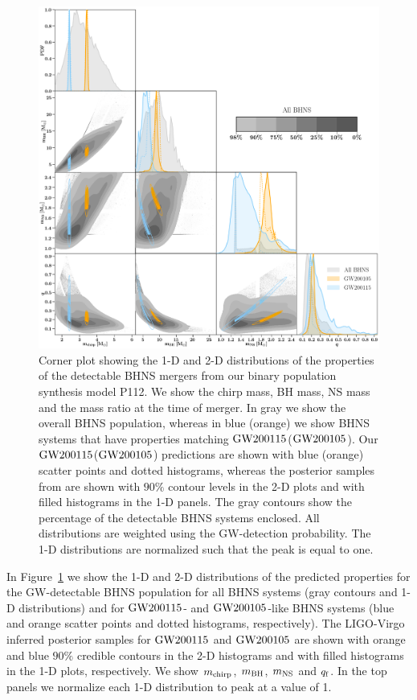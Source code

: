 \documentclass{aastex63}
\newcommand{\mnsf}{\ensuremath{m_{\rm{NS}}}\xspace}
\newcommand{\mbhf}{\ensuremath{m_{\rm{BH}}}\xspace}
\newcommand{\mchirpf}{\ensuremath{{m}_{\rm{chirp}}}\xspace}
\newcommand{\qf}{\ensuremath{q_{\rm{f}}}\xspace}
\newcommand{\gwone}{\ensuremath{\rm{GW200115}}\xspace}
\newcommand{\gwzero}{\ensuremath{\rm{GW200105}}\xspace}
\newcommand{\model}{P112\xspace}
\begin{document}
\begin{figure}
    \centering
\includegraphics[width=1.0\textwidth]{figures/Scatter_Final_kde_with_LV_112_P.png} 
    \caption{Corner plot showing the 1-D and 2-D distributions of the properties of the detectable \ac{BHNS} mergers from our binary population synthesis model \model.  We show the chirp mass, \ac{BH} mass, \ac{NS} mass and the mass ratio at the time of merger.  In gray we show the overall \ac{BHNS} population, whereas in blue (orange) we show \ac{BHNS} systems that have properties matching \gwone (\gwzero). Our \gwone (\gwzero) predictions are shown with blue (orange) scatter points and dotted histograms, whereas the posterior samples from \citet{Abbott:2021-first-NSBH} are shown with  $90\%$ contour levels in the 2-D plots and with filled histograms in the 1-D panels.  The gray contours show the percentage of the detectable \ac{BHNS} systems enclosed.  All distributions are weighted using the \ac{GW}-detection probability. The 1-D distributions are normalized such that the peak is equal to one. 
    }
    \label{fig:Triangle-final}
\end{figure}

In Figure~\ref{fig:Triangle-final} we show the 1-D and 2-D distributions of the predicted properties for the \ac{GW}-detectable \ac{BHNS} population for all \ac{BHNS} systems (gray contours and 1-D distributions) and for \gwone- and \gwzero-like \ac{BHNS} systems (blue and orange scatter points and dotted histograms, respectively). The LIGO-Virgo inferred posterior samples for \gwone and \gwzero are shown with orange and blue $90\%$ credible contours in the 2-D histograms and with filled histograms in the 1-D plots, respectively. We show \mchirpf, \mbhf, \mnsf and \qf. In the top panels we normalize each 1-D distribution to peak at a value of 1. 
\end{document}
